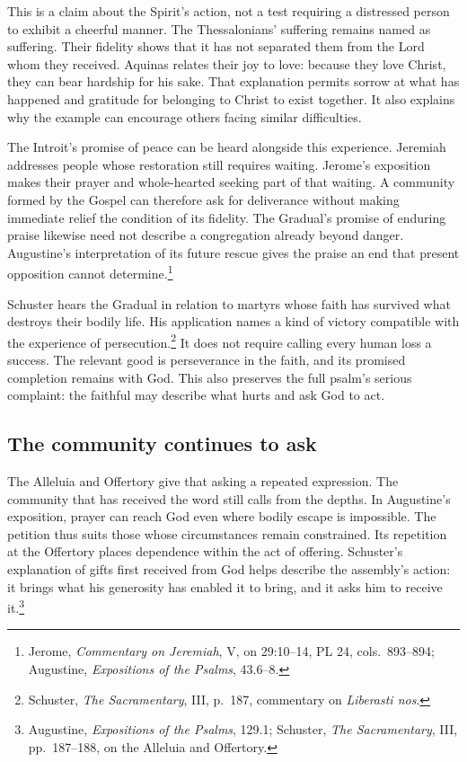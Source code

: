 This is a claim about the Spirit's action, not a test requiring a distressed person to exhibit a cheerful manner. The Thessalonians' suffering remains named as suffering. Their fidelity shows that it has not separated them from the Lord whom they received. Aquinas relates their joy to love: because they love Christ, they can bear hardship for his sake. That explanation permits sorrow at what has happened and gratitude for belonging to Christ to exist together. It also explains why the example can encourage others facing similar difficulties.

The Introit's promise of peace can be heard alongside this experience. Jeremiah addresses people whose restoration still requires waiting. Jerome's exposition makes their prayer and whole-hearted seeking part of that waiting. A community formed by the Gospel can therefore ask for deliverance without making immediate relief the condition of its fidelity. The Gradual's promise of enduring praise likewise need not describe a congregation already beyond danger. Augustine's interpretation of its future rescue gives the praise an end that present opposition cannot determine.\footnote{Jerome, \textit{Commentary on Jeremiah}, V, on 29:10--14, PL 24, cols.~893--894; Augustine, \textit{Expositions of the Psalms}, 43.6--8.}

Schuster hears the Gradual in relation to martyrs whose faith has survived what destroys their bodily life. His application names a kind of victory compatible with the experience of persecution.\footnote{Schuster, \textit{The Sacramentary}, III, p.~187, commentary on \textit{Liberasti nos}.} It does not require calling every human loss a success. The relevant good is perseverance in the faith, and its promised completion remains with God. This also preserves the full psalm's serious complaint: the faithful may describe what hurts and ask God to act.

\subsection{The community continues to ask}

The Alleluia and Offertory give that asking a repeated expression. The community that has received the word still calls from the depths. In Augustine's exposition, prayer can reach God even where bodily escape is impossible. The petition thus suits those whose circumstances remain constrained. Its repetition at the Offertory places dependence within the act of offering. Schuster's explanation of gifts first received from God helps describe the assembly's action: it brings what his generosity has enabled it to bring, and it asks him to receive it.\footnote{Augustine, \textit{Expositions of the Psalms}, 129.1; Schuster, \textit{The Sacramentary}, III, pp.~187--188, on the Alleluia and Offertory.}


